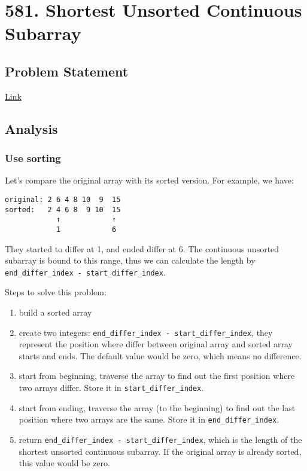 \documentclass[12pt]{book}
\begin{document}
\chapter{581. Shortest Unsorted Continuous Subarray}
\label{sec:org5910d1c}
\section{Problem Statement}
\label{sec:orgee657d2}
\href{https://leetcode.com/problems/shortest-unsorted-continuous-subarray/}{Link}
\section{Analysis}
\label{sec:org8deac3d}
\subsection{Use sorting}
\label{sec:orge8df85e}
Let's compare the original array with its sorted version. For example, we have:
\begin{verbatim}
original: 2 6 4 8 10  9  15
sorted:   2 4 6 8  9 10  15
            ↑            ↑
            1            6
\end{verbatim}
They started to differ at 1, and ended differ at 6. The continuous unsorted subarray is bound to this range, thus we can calculate the length by \texttt{end\_differ\_index - start\_differ\_index}.

Steps to solve this problem:
\begin{enumerate}
\item build a sorted array
\item create two integers: \texttt{end\_differ\_index - start\_differ\_index}, they represent the position where differ between original array and sorted array starts and ends. The default value would be zero, which means no difference.
\item start from beginning, traverse the array to find out the first position where two arrays differ. Store it in \texttt{start\_differ\_index}.
\item start from ending, traverse the array (to the beginning) to find out the last position where two arrays are the same. Store it in \texttt{end\_differ\_index}.
\item return \texttt{end\_differ\_index - start\_differ\_index}, which is the length of the shortest unsorted continuous subarray. If the original array is already sorted, this value would be zero.
\end{enumerate}
\end{document}

